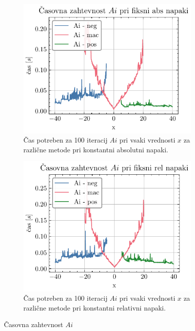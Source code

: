 \documentclass[slovene,11pt,a4paper]{article}
\begin{document}
\begin{figure}[h]
  \begin{subfigure}{0.48\textwidth}
    \centering
    \includegraphics[width=\linewidth]{graphs/cas_ai_abs.pdf}
    \caption{Čas potreben za 100 iteracij $Ai$ pri vsaki vrednosti $x$ za različne metode pri konstantni absolutni napaki.}
  \end{subfigure}\hfill
  \begin{subfigure}{0.48\textwidth}
    \centering
    \includegraphics[width=\linewidth]{graphs/cas_ai_rel.pdf}
    \caption{Čas potreben za 100 iteracij $Ai$ pri vsaki vrednosti $x$ za različne metode pri konstantni relativni napaki.}
  \end{subfigure}
  \caption{Časovna zahtevnost $Ai$}
  \label{cas ai}
\end{figure}
\end{document}
